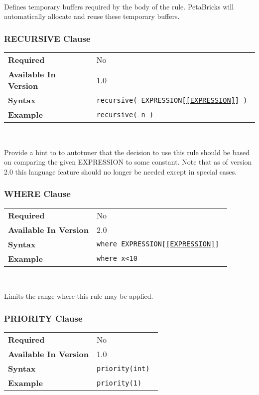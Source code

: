 \documentclass[11pt]{article}
\begin{document}
~

\noindent Defines temporary buffers required by the body of the rule.
PetaBricks will automatically allocate and reuse these temporary buffers.

\subsubsection{RECURSIVE Clause}
\begin{tabular}{| l | l |}
\hline
\bf Required & No \\
\bf Available In Version & 1.0             \\
\bf Syntax & \tt recursive( EXPRESSION[\ref{EXPRESSION}] )   \\
\bf Example & \tt recursive( n )           \\
\hline
\end{tabular}

~

\noindent Provide a hint to to autotuner that the decision to use this
rule should be based on comparing the given EXPRESSION to some constant.
Note that as of version 2.0 this language feature should no longer be needed
except in special cases.


\subsubsection{WHERE Clause}
\begin{tabular}{| l | l |}
\hline
\bf Required & No                          \\
\bf Available In Version & 2.0             \\
\bf Syntax & \tt where EXPRESSION[\ref{EXPRESSION}] \\
\bf Example & \tt where x<10               \\
\hline
\end{tabular}

~

\noindent Limits the range where this rule may be applied.

\subsubsection{PRIORITY Clause}
\begin{tabular}{| l | l |}
\hline
\bf Required & No                          \\
\bf Available In Version & 1.0             \\
\bf Syntax & \tt priority(int)             \\
\bf Example & \tt priority(1)              \\
\hline
\end{tabular}
\end{document}
